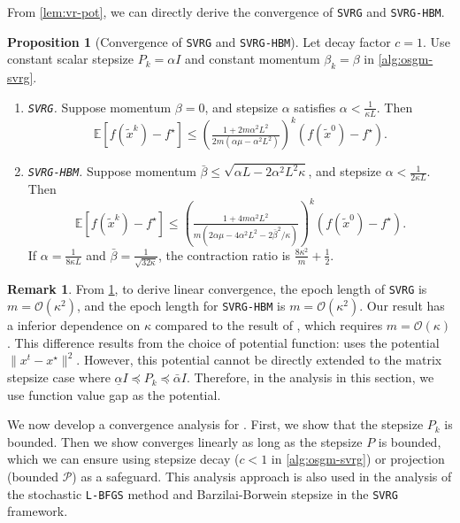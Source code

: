 \documentclass{article}
\theoremstyle{definition}
\newtheorem{proposition}[proposition]{Proposition}
\newtheorem{remark}[remark]{Remark}
\DeclareRobustCommand{\namerefc}[2]{\hyperref[#2]{\textcolor{#1}{\nameref*{#2}}}}
\newcommand{\ov}{\namerefc{purple}{alg:osgm-svrg}}
\newcommand{\svrg}{\texttt{SVRG}}
\newcommand{\sh}{\texttt{SVRG-HBM}}
\begin{document}
From \cref{lem:vr-pot}, we can directly derive the convergence of {\svrg} and {\sh}.

\begin{proposition}[Convergence of {\svrg} and {\sh}]
  \label{prop:svrg-conv} Let decay factor $c=1$. Use constant scalar stepsize $P_k=\alpha I$ and constant momentum $\beta_k=\beta$ in \cref{alg:osgm-svrg}.
  \begin{enumerate}
    \item \emph{{\svrg}.} Suppose momentum $\beta = 0$, and stepsize $\alpha$ satisfies $\alpha <
    \tfrac{1}{\kappa L}$. Then
    \[ \mathbb{E} [f (\tilde{x}^{k}) - f^{\star}] \leq \left(\tfrac{1 + 2 m \alpha^2 L^2}{2 m (\alpha \mu - \alpha^2 L^2)}\right)^k (f(\tilde{x}^0) - f^{\star}). \]
    \item \emph{{\sh}.} Suppose momentum $\bar{\beta} \leq \sqrt{\alpha L - 2 \alpha^2
  L^2 \kappa}$, and stepsize $\alpha
  < \tfrac{1}{2 \kappa L}$. Then
    \[ \mathbb{E} [f (\tilde{x}^{k}) - f^{\star}] \leq \left( \tfrac{1 + 4 m \alpha^2 L^2}{m( 2 \alpha \mu - 4
    \alpha^2 L^2 - {2 \bar{\beta}^2}/{\kappa} )} \right)^k (f(\tilde{x}^0) - f^{\star}). \]
    If $\alpha = \tfrac{1}{8 \kappa
  L}$ and $\bar{\beta} = \tfrac{1}{\sqrt{32 \kappa}}$, the contraction ratio
  is $\tfrac{8 \kappa^2}{m} + \tfrac{1}{2}$.
  \end{enumerate}
\end{proposition}



\begin{remark}
  From \cref{prop:svrg-conv}, to derive linear convergence, the epoch length of {\svrg} is $m = \mathcal{O}(\kappa^2)$, and the epoch length for {\sh} is $m = \mathcal{O}(\kappa^2)$. Our result has a inferior dependence on $\kappa$ compared to the result of {\cite{johnson2013accelerating}}, which requires $m = \mathcal{O} (\kappa)$. This difference results from the choice of potential function: {\cite{johnson2013accelerating}} uses the potential $\| x^t - x^{\star}\|^2$.
  However, this potential cannot be directly extended to the matrix stepsize case where $\underline{\alpha} I \preceq P_k \preceq \bar{\alpha} I$. 
  Therefore, in the analysis in this section, we use function value gap as the potential.
\end{remark}

We now develop a convergence analysis for {\ov}.
First, we show that the stepsize $P_k$ is bounded. 
Then we show {\ov} converges linearly as long as the stepsize $P$ is bounded,
which we can ensure using stepsize decay ($c < 1$ in \cref{alg:osgm-svrg}) or projection (bounded $\mathcal P$) as a safeguard. This analysis approach is also used in the analysis of the stochastic \texttt{L-BFGS} method {\cite{moritz2016linearly}} and Barzilai-Borwein stepsize {\cite{tan2016barzilai}} in the {\svrg} framework.
\end{document}
